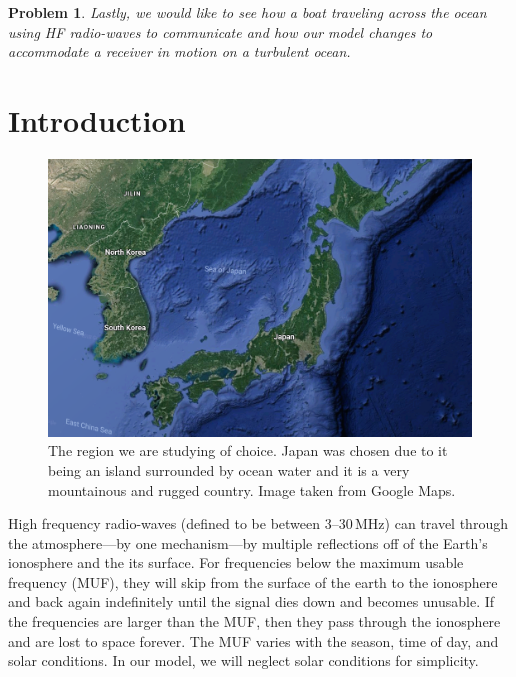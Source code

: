 \documentclass[11pt]{article}
\newtheorem{problem}{Problem}
\numberwithin{equation}{section}
\begin{document}
\begin{problem}
    Lastly, we would like to see how a boat traveling across the ocean using HF radio-waves to communicate and how our model changes to accommodate a receiver in motion on a turbulent ocean.
    \label{pr:boat}
\end{problem}

\section{Introduction} 
\label{sec: intro} 

 \begin{figure}[ht]
 \begin{center}
     \includegraphics[width = 4.55in]{figs/japan.png}
 \end{center}
 \caption{The region we are studying of choice. Japan was chosen due to it being an island surrounded by ocean water and it is a very mountainous and rugged country. Image taken from Google Maps.}
 \label{fig:jap} 
\end{figure} 

High frequency radio-waves (defined to be between 3--30\,\si{\mega\hertz}) can travel through the atmosphere---by one mechanism---by multiple reflections off of the Earth's ionosphere and the its surface. For frequencies below the maximum usable frequency (MUF), they will skip from the surface of the earth to the ionosphere and back again indefinitely until the signal dies down and becomes unusable. If the frequencies are larger than the MUF, then they pass through the ionosphere and are lost to space forever. The MUF varies with the season, time of day, and solar conditions.\cite{mcm_statement} In our model, we will neglect solar conditions for simplicity.
\end{document}
